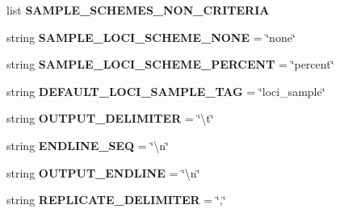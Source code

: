 \begin{DoxyCompactItemize}
\item 
list {\bfseries S\+A\+M\+P\+L\+E\+\_\+\+S\+C\+H\+E\+M\+E\+S\+\_\+\+N\+O\+N\+\_\+\+C\+R\+I\+T\+E\+R\+IA}
\item 
string {\bfseries S\+A\+M\+P\+L\+E\+\_\+\+L\+O\+C\+I\+\_\+\+S\+C\+H\+E\+M\+E\+\_\+\+N\+O\+NE} = \char`\"{}none\char`\"{}\hypertarget{namespacenegui_1_1pgdriveneestimator_a6d7da19fa549e375834075b13ebf02c5}{}\label{namespacenegui_1_1pgdriveneestimator_a6d7da19fa549e375834075b13ebf02c5}

\item 
string {\bfseries S\+A\+M\+P\+L\+E\+\_\+\+L\+O\+C\+I\+\_\+\+S\+C\+H\+E\+M\+E\+\_\+\+P\+E\+R\+C\+E\+NT} = \char`\"{}percent\char`\"{}\hypertarget{namespacenegui_1_1pgdriveneestimator_a312ff7ad92da1221ed16b20ced0bf49b}{}\label{namespacenegui_1_1pgdriveneestimator_a312ff7ad92da1221ed16b20ced0bf49b}

\item 
string {\bfseries D\+E\+F\+A\+U\+L\+T\+\_\+\+L\+O\+C\+I\+\_\+\+S\+A\+M\+P\+L\+E\+\_\+\+T\+AG} = \char`\"{}loci\+\_\+sample\char`\"{}\hypertarget{namespacenegui_1_1pgdriveneestimator_a31ddb30a42003f3bd52b0209ecd9616d}{}\label{namespacenegui_1_1pgdriveneestimator_a31ddb30a42003f3bd52b0209ecd9616d}

\item 
string {\bfseries O\+U\+T\+P\+U\+T\+\_\+\+D\+E\+L\+I\+M\+I\+T\+ER} = \char`\"{}\textbackslash{}t\char`\"{}\hypertarget{namespacenegui_1_1pgdriveneestimator_a68b08075d6e1a58ae325c600881c9d6c}{}\label{namespacenegui_1_1pgdriveneestimator_a68b08075d6e1a58ae325c600881c9d6c}

\item 
string {\bfseries E\+N\+D\+L\+I\+N\+E\+\_\+\+S\+EQ} = \char`\"{}\textbackslash{}n\char`\"{}\hypertarget{namespacenegui_1_1pgdriveneestimator_aa8d38cb5ca07a3c1f89cd4c3d7cccb08}{}\label{namespacenegui_1_1pgdriveneestimator_aa8d38cb5ca07a3c1f89cd4c3d7cccb08}

\item 
string {\bfseries O\+U\+T\+P\+U\+T\+\_\+\+E\+N\+D\+L\+I\+NE} = \char`\"{}\textbackslash{}n\char`\"{}\hypertarget{namespacenegui_1_1pgdriveneestimator_a56a1a1d753221dfbed6ffc7cd58222f1}{}\label{namespacenegui_1_1pgdriveneestimator_a56a1a1d753221dfbed6ffc7cd58222f1}

\item 
string {\bfseries R\+E\+P\+L\+I\+C\+A\+T\+E\+\_\+\+D\+E\+L\+I\+M\+I\+T\+ER} = \char`\"{},\char`\"{}\hypertarget{namespacenegui_1_1pgdriveneestimator_a4a72408d1cee500503a7aa185253b438}{}\label{namespacenegui_1_1pgdriveneestimator_a4a72408d1cee500503a7aa185253b438}


\end{DoxyCompactItemize}

